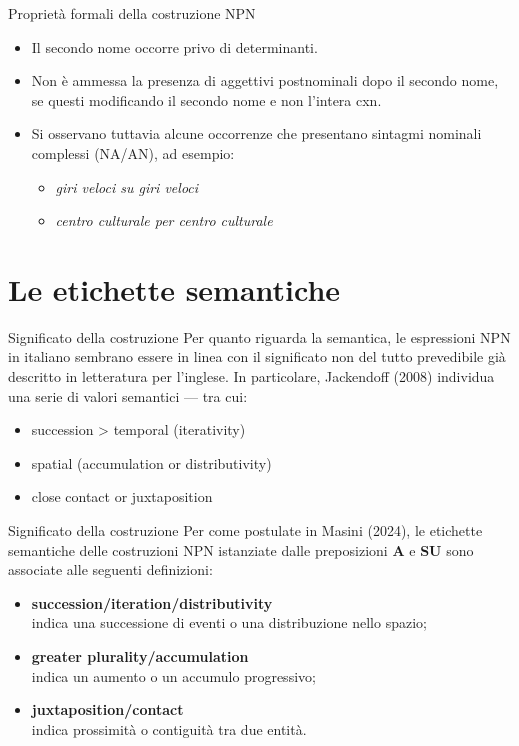 \documentclass{beamer}
\begin{document}
\begin{frame}{Proprietà formali della costruzione NPN}
    \begin{itemize}
        \item Il secondo nome occorre privo di determinanti.
        \item Non è ammessa la presenza di aggettivi postnominali dopo il secondo nome, se questi modificando il secondo nome e non l'intera cxn. 
		 \item Si osservano tuttavia alcune occorrenze che presentano sintagmi nominali complessi (NA/AN), ad esempio:
        \begin{itemize}
            \item \textit{giri veloci su giri veloci}
            \item \textit{centro culturale per centro culturale}
        \end{itemize}
    \end{itemize}
\end{frame}

\section{Le etichette semantiche}

\begin{frame}{Significato della costruzione}
Per quanto riguarda la semantica, le espressioni NPN in italiano sembrano essere in linea con il significato non del tutto prevedibile già descritto in letteratura per l’inglese. In particolare, Jackendoff (2008) individua una serie di valori semantici — tra cui:
\begin{itemize}
	\item succession > temporal (iterativity)
	\item spatial (accumulation or distributivity)
	\item close contact or juxtaposition
\end{itemize}
\end{frame}


\begin{frame}{Significato della costruzione}
    Per come postulate in Masini (2024), le etichette semantiche delle costruzioni NPN istanziate dalle preposizioni \textbf{A} e \textbf{SU} sono associate alle seguenti definizioni:
    
    \begin{itemize}
        \item \textbf{succession/iteration/distributivity} \\
        indica una successione di eventi o una distribuzione nello spazio;
        \item \textbf{greater plurality/accumulation} \\
        indica un aumento o un accumulo progressivo;
        \item \textbf{juxtaposition/contact} \\
        indica prossimità o contiguità tra due entità.
    \end{itemize}
\end{frame}
\end{document}

